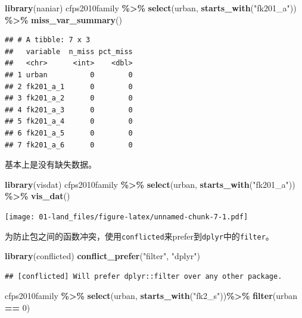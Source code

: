 \documentclass[
  oneside]{book}
\newenvironment{Shaded}{\begin{snugshade}}{\end{snugshade}}
\newcommand{\DecValTok}[1]{\textcolor[rgb]{0.00,0.00,0.81}{#1}}
\newcommand{\FunctionTok}[1]{\textcolor[rgb]{0.13,0.29,0.53}{\textbf{#1}}}
\newcommand{\NormalTok}[1]{#1}
\newcommand{\SpecialCharTok}[1]{\textcolor[rgb]{0.81,0.36,0.00}{\textbf{#1}}}
\newcommand{\StringTok}[1]{\textcolor[rgb]{0.31,0.60,0.02}{#1}}
\begin{document}
\begin{Shaded}
\begin{Highlighting}[]
\FunctionTok{library}\NormalTok{(naniar)}
\NormalTok{cfps2010family }\SpecialCharTok{\%\textgreater{}\%}
  \FunctionTok{select}\NormalTok{(urban, }\FunctionTok{starts\_with}\NormalTok{(}\StringTok{"fk201\_a"}\NormalTok{)) }\SpecialCharTok{\%\textgreater{}\%}
  \FunctionTok{miss\_var\_summary}\NormalTok{()}
\end{Highlighting}
\end{Shaded}

\begin{verbatim}
## # A tibble: 7 x 3
##   variable  n_miss pct_miss
##   <chr>      <int>    <dbl>
## 1 urban          0        0
## 2 fk201_a_1      0        0
## 3 fk201_a_2      0        0
## 4 fk201_a_3      0        0
## 5 fk201_a_4      0        0
## 6 fk201_a_5      0        0
## 7 fk201_a_6      0        0
\end{verbatim}

基本上是没有缺失数据。

\begin{Shaded}
\begin{Highlighting}[]
\FunctionTok{library}\NormalTok{(visdat)}
\NormalTok{cfps2010family }\SpecialCharTok{\%\textgreater{}\%}
  \FunctionTok{select}\NormalTok{(urban, }\FunctionTok{starts\_with}\NormalTok{(}\StringTok{"fk201\_a"}\NormalTok{)) }\SpecialCharTok{\%\textgreater{}\%}
  \FunctionTok{vis\_dat}\NormalTok{()}
\end{Highlighting}
\end{Shaded}

\texttt{[image: 01-land\_files/figure-latex/unnamed-chunk-7-1.pdf]}

为防止包之间的函数冲突，使用\texttt{conflicted}来prefer到\texttt{dplyr}中的\texttt{filter}。

\begin{Shaded}
\begin{Highlighting}[]
\FunctionTok{library}\NormalTok{(conflicted)}
\FunctionTok{conflict\_prefer}\NormalTok{(}\StringTok{"filter"}\NormalTok{, }\StringTok{"dplyr"}\NormalTok{)}
\end{Highlighting}
\end{Shaded}

\begin{verbatim}
## [conflicted] Will prefer dplyr::filter over any other package.
\end{verbatim}

\begin{Shaded}
\begin{Highlighting}[]
\NormalTok{cfps2010family }\SpecialCharTok{\%\textgreater{}\%}
  \FunctionTok{select}\NormalTok{(urban, }\FunctionTok{starts\_with}\NormalTok{(}\StringTok{"fk2\_s"}\NormalTok{))}\SpecialCharTok{\%\textgreater{}\%}
  \FunctionTok{filter}\NormalTok{(urban }\SpecialCharTok{==} \DecValTok{0}\NormalTok{)}
\end{Highlighting}
\end{Shaded}
\end{document}
